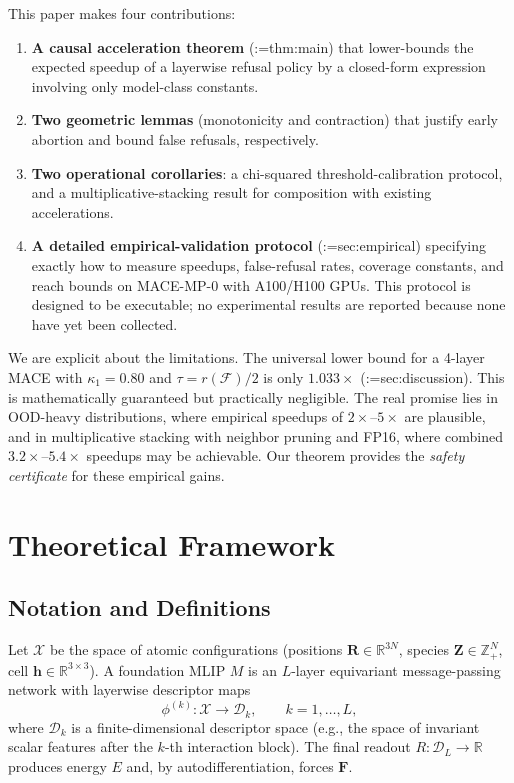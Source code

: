 \documentclass[11pt,a4paper]{article}
\makeatletter
\newcommand{\cref}[1]{\begingroup\def\crefsep{}\@for\crefitem:=#1\do{\crefsep\ref{\crefitem}\def\crefsep{, }}\endgroup}
\makeatother
\begin{document}
This paper makes four contributions:
\begin{enumerate}
    \item \textbf{A causal acceleration theorem} (\cref{thm:main}) that lower-bounds the expected speedup of a layerwise refusal policy by a closed-form expression involving only model-class constants.
    \item \textbf{Two geometric lemmas} (monotonicity and contraction) that justify early abortion and bound false refusals, respectively.
    \item \textbf{Two operational corollaries}: a chi-squared threshold-calibration protocol, and a multiplicative-stacking result for composition with existing accelerations.
    \item \textbf{A detailed empirical-validation protocol} (\cref{sec:empirical}) specifying exactly how to measure speedups, false-refusal rates, coverage constants, and reach bounds on MACE-MP-0 with A100/H100 GPUs. This protocol is designed to be executable; no experimental results are reported because none have yet been collected.
\end{enumerate}

We are explicit about the limitations. The universal lower bound for a 4-layer MACE with $\kappa_1=0.80$ and $\tau=r(\mathcal{F})/2$ is only $1.033\times$ (\cref{sec:discussion}). This is mathematically guaranteed but practically negligible. The real promise lies in OOD-heavy distributions, where empirical speedups of $2\times$--$5\times$ are plausible, and in multiplicative stacking with neighbor pruning and FP16, where combined $3.2\times$--$5.4\times$ speedups may be achievable. Our theorem provides the \emph{safety certificate} for these empirical gains.

\section{Theoretical Framework}\label{sec:theory}

\subsection{Notation and Definitions}\label{sec:notation}

Let $\mathcal{X}$ be the space of atomic configurations (positions $\mathbf{R}\in\mathbb{R}^{3N}$, species $\mathbf{Z}\in\mathbb{Z}_{+}^N$, cell $\mathbf{h}\in\mathbb{R}^{3\times 3}$). A foundation MLIP $M$ is an $L$-layer equivariant message-passing network with layerwise descriptor maps
\begin{equation}
    \phi^{(k)}: \mathcal{X} \to \mathcal{D}_k, \qquad k=1,\dots,L,
\end{equation}
where $\mathcal{D}_k$ is a finite-dimensional descriptor space (e.g., the space of invariant scalar features after the $k$-th interaction block). The final readout $R: \mathcal{D}_L \to \mathbb{R}$ produces energy $E$ and, by autodifferentiation, forces $\mathbf{F}$.
\end{document}
